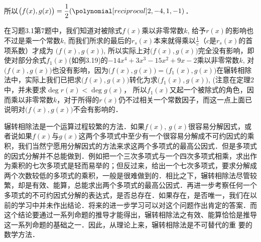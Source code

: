 \begin{solution}
\begin{center}
\end{center}    

所以$\big(f(x),g(x)\big)=\frac{1}{2}(\poly{2,-4,1,-1})$．
\end{solution}

在习题3.1第7题中，我们知道对被除式$f(x)$乘以非零常数$k$, 给予$r(x)$的影响也不过是乘一个常数$k$, 而我们所求的最后的$r_s(x)$本来就得乘以$\frac{1}{c}$（$c$是$r_s(x)$的首项系数）才成为
$\big(f(x),g(x)\big)$, 所以实际上对$\big(f(x),g(x)\big)$完全没有影响，即使对部分余式$f_1(x)$(如例3.19)的$-14x^4+3x^3-15x^2+9x-2$乘以非零常数$k$, 对$\big(f(x),g(x)\big)$也没有影响，因为$\big(f(x),g(x)\big)=\big(f_1(x),g(x)\big)$在辗转相除法中，实际上我们已把求$\big(f(x),g(x)\big)$转化为求$\big(f_1(x),g(x)\big)$, (注意在定理2中，并未要求$\deg r(x)<\deg g(x)$，
所以$f_1(x)$又起一个被除式的角色，因而乘以非零常数$k$，对于所得的$r(x)$仍不过相关一个常数因子，而这一点上面已说明对$\big(f(x),g(x)\big)$不会有影响的．

辗转相除法是一个运算过程较繁的方法．如果$f(x)$, $g(x)$很容易分解因式，或者说如果$f(x)$与$g(x)$这两个多项式中至少有一个很容易分解成不可约因式的乘积，我们当然宁愿用分解因式的方法来求这两个多项式的最高公因式．但是多项式的因式分解并不总能做到．例如把一个三次多项式与一个四次多项式相乘，求出作为乘积的七次多项式是轻而易举的；但反过来，给出一个七次多项式，要求分解成两个次数较低的多项式的乘积，一般是很难做到的．相比之下，辗转相除法尽管较繁，却是有效、能算，总能求出两个多项式的最高公因式．再进一步考察任何一个多项式的不可约因式分解的表达式，是否总存在．如果存在，是否唯一，我们在以前的学习中并未作出结论．将来的进一步学习可以对这个问题作出肯定的答案．而这个结论要通过一系列命题的推导才能得出，辗转相除法之有效、能算恰恰是推导这一系列命题的基础之一．因此，从理论上来，辗转相除法是不可替代的重
要的数学方法．

